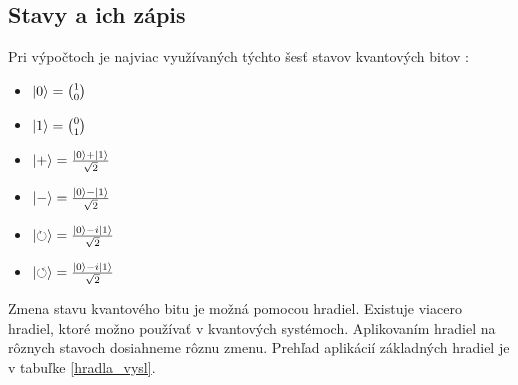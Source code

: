 \subsection{Stavy a ich zápis}

Pri výpočtoch je najviac využívaných týchto šesť stavov kvantových bitov 
\cite{Wei02}:
\begin{itemize}
\item[] \(\Ket{0} = \binom{1}{0}\)
\item[] \(\Ket{1} = \binom{0}{1}\)
\item[] \(\Ket{+} = \frac{\Ket{0} + \Ket{1}}{\sqrt{2}}\)
\item[] \(\Ket{-} = \frac{\Ket{0} - \Ket{1}}{\sqrt{2}}\)
\item[] \(\Ket{\circlearrowright} = \frac{\Ket{0} - i\Ket{1}}{\sqrt{2}}\)
\item[] \(\Ket{\circlearrowleft} = \frac{\Ket{0} - i\Ket{1}}{\sqrt{2}}\)
\end{itemize}

Zmena stavu kvantového bitu je možná pomocou hradiel. Existuje viacero
hradiel, ktoré možno používať v kvantových systémoch. Aplikovaním hradiel
na rôznych stavoch dosiahneme rôznu zmenu. Prehľad aplikácií základných 
hradiel je v tabuľke \ref{hradla_vysl}.

